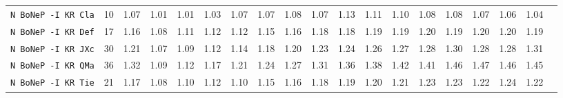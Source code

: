 \begin{tabular}{l | r @{~~} r | r@{~~}r@{~~}r@{~~}r@{~~}r@{~~}r@{~~}r@{~~}r@{~~}r@{~~}r@{~~}r@{~~}r@{~~}r@{~~}r@{~~}r@{~~}r|}
\verb+N BoNeP -I KR Cla+ & 10 & 1.07 & 1.01&1.01&1.03&1.07&1.07&1.08&1.07&1.13&1.11&1.10&1.08&1.08&1.07&1.06&1.04\\
\verb+N BoNeP -I KR Def+ & 17 & 1.16 & 1.08&1.11&1.12&1.12&1.15&1.16&1.18&1.18&1.19&1.19&1.20&1.19&1.20&1.20&1.19\\
\verb+N BoNeP -I KR JXc+ & 30 & 1.21 & 1.07&1.09&1.12&1.14&1.18&1.20&1.23&1.24&1.26&1.27&1.28&1.30&1.28&1.28&1.31\\
\verb+N BoNeP -I KR QMa+ & 36 & 1.32 & 1.09&1.12&1.17&1.21&1.24&1.27&1.31&1.36&1.38&1.42&1.41&1.46&1.47&1.46&1.45\\
\verb+N BoNeP -I KR Tie+ & 21 & 1.17 & 1.08&1.10&1.12&1.10&1.15&1.16&1.18&1.19&1.20&1.21&1.23&1.23&1.22&1.24&1.22\\
\end{tabular}
